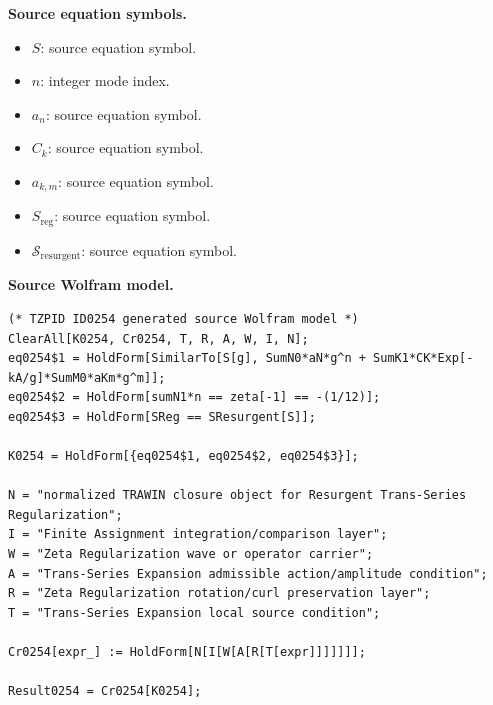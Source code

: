 \begin{minipage}[t]{0.49\linewidth}
\begingroup
\small
\raggedright
\textbf{Source equation symbols.}\par
\begin{itemize}[leftmargin=1.35em,itemsep=1pt,topsep=1pt,parsep=0pt]
    \item $S$: source equation symbol.
    \item $n$: integer mode index.
    \item $a_n$: source equation symbol.
    \item $C_k$: source equation symbol.
    \item $a_{k,m}$: source equation symbol.
    \item $S_{\mathrm{reg}}$: source equation symbol.
    \item $\mathcal{S}_{\mathrm{resurgent}}$: source equation symbol.
\end{itemize}
\endgroup
\end{minipage}\hfill
\begin{minipage}[t]{0.47\linewidth}
\begingroup
\scriptsize
\raggedright
\textbf{Source Wolfram model.}\par
\begin{Verbatim}[fontsize=\tiny,breaklines=true,breakanywhere=true]
(* TZPID ID0254 generated source Wolfram model *)
ClearAll[K0254, Cr0254, T, R, A, W, I, N];
eq0254$1 = HoldForm[SimilarTo[S[g], SumN0*aN*g^n + SumK1*CK*Exp[-kA/g]*SumM0*aKm*g^m]];
eq0254$2 = HoldForm[sumN1*n == zeta[-1] == -(1/12)];
eq0254$3 = HoldForm[SReg == SResurgent[S]];

K0254 = HoldForm[{eq0254$1, eq0254$2, eq0254$3}];

N = "normalized TRAWIN closure object for Resurgent Trans-Series Regularization";
I = "Finite Assignment integration/comparison layer";
W = "Zeta Regularization wave or operator carrier";
A = "Trans-Series Expansion admissible action/amplitude condition";
R = "Zeta Regularization rotation/curl preservation layer";
T = "Trans-Series Expansion local source condition";

Cr0254[expr_] := HoldForm[N[I[W[A[R[T[expr]]]]]]];

Result0254 = Cr0254[K0254];
\end{Verbatim}
\endgroup
\end{minipage}

